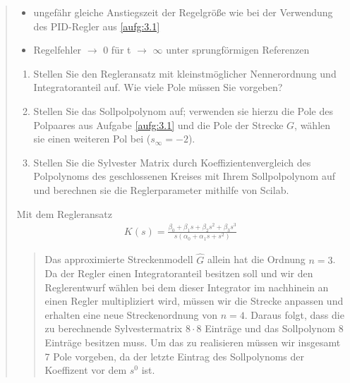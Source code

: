 \begin{quote}
\begin{itemize}
            \item ungefähr gleiche Anstiegszeit der Regelgröße wie bei der Verwendung des PID-Regler aus \ref{aufg:3.1}
            
            \item Regelfehler $\to$ 0 für t $\to$ $\infty$ unter sprungförmigen Referenzen
        
        \end{itemize}
        \vspace{1em}
        
        \begin{enumerate}
            
            \item Stellen Sie den Regleransatz mit kleinstmöglicher Nennerordnung und Integratoranteil auf. Wie viele Pole
            müssen Sie vorgeben?
            
            \item Stellen Sie das Sollpolpolynom auf; verwenden sie hierzu die Pole des Polpaares aus Aufgabe \ref{aufg:3.1}
            und die Pole der Strecke $G$, wählen sie einen weiteren Pol bei ($s_\infty = -2$).
            
            \item Stellen Sie die Sylvester Matrix durch Koeffizientenvergleich des Polpolynoms des geschlossenen Kreises
            mit Ihrem Sollpolpolynom auf und berechnen sie die Reglerparameter mithilfe von Scilab.
        
        \end{enumerate}\vspace{1em}
       
        Mit dem Regleransatz\\
        
        \begin{equation*}
            \begin{split}
                K(s) = \frac{\beta_0 + \beta_1 s + \beta_2 s^2 + \beta_3 s^3}{s(\alpha_0 + \alpha_1 s + s^2)}
            \end{split}
        \end{equation*}\vspace{1em}
        
    \begin{quote}
      
        Das approximierte Streckenmodell $\hat{G}$ allein hat die Ordnung $n = 3$. Da der Regler einen
        Integratoranteil besitzen soll und wir den Reglerentwurf wählen bei dem dieser Integrator im nachhinein
        an einen Regler multipliziert wird, müssen wir die Strecke anpassen und erhalten eine neue Streckenordnung von
        $n = 4$. Daraus folgt, dass die zu berechnende Sylvestermatrix $8\cdot 8$ Einträge und das Sollpolynom 8
        Einträge besitzen muss. Um das zu realisieren müssen wir insgesamt 7 Pole vorgeben, da der letzte Eintrag des
        Sollpolynoms der Koeffizent vor dem $s^0$ ist.\\
        

\end{quote}
\end{quote}
